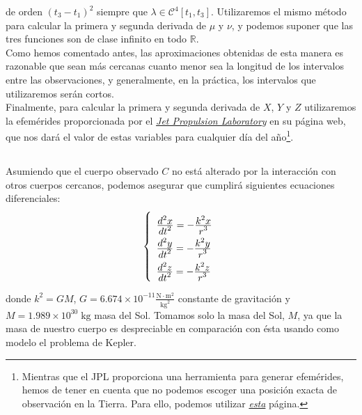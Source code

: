 \documentclass[11pt]{article}
\newcommand\ddfrac[2]{\frac{\displaystyle #1}{\displaystyle #2}}
\begin{document}
\noindent de orden $(t_3-t_1)^2$ siempre que $\lambda\in\mathcal{C}^4[t_1,t_3]$. Utilizaremos el mismo método para calcular la primera y segunda derivada de $\mu$ y $\nu$, y podemos suponer que las tres funciones son de clase infinito en todo $\mathbb{R}$.\\

Como hemos comentado antes, las aproximaciones obtenidas de esta manera es razonable que sean más cercanas cuanto menor sea la longitud de los intervalos entre las observaciones, y generalmente, en la práctica, los intervalos que utilizaremos serán cortos.\\

Finalmente, para calcular la primera y segunda derivada de $X$, $Y$ y $Z$ utilizaremos la efemérides proporcionada por el \href{https://ssd.jpl.nasa.gov/horizons.cgi}{\textit{Jet Propulsion Laboratory}} en su página web, que nos dará el valor de estas variables para cualquier día del año\footnote{Mientras que el JPL proporciona una herramienta para generar efemérides, hemos de tener en cuenta que no podemos escoger una posición exacta de observación en la Tierra. Para ello, podemos utilizar \href{http://xjubier.free.fr/en/site_pages/astronomy/ephemerides.html}{\textit{esta}} página.}.\\

\subsection{}
\label{subsec:ley_gravitacion}
Asumiendo que el cuerpo observado $C$ no está alterado por la interacción con otros cuerpos cercanos, podemos asegurar que cumplirá siguientes ecuaciones diferenciales:
\begin{align}
\left\{
\def\arraystretch{2}
\begin{array}{l}
	\ddfrac{d^2x}{dt^2}=-\ddfrac{k^2x}{r^3}\\
	\ddfrac{d^2y}{dt^2}=-\ddfrac{k^2y}{r^3}\\
	\ddfrac{d^2z}{dt^2}=-\ddfrac{k^2z}{r^3}
\end{array}
\right.
\label{eq:ley_gravitacion_C}
\end{align}

\noindent donde $k^2=GM$, $G=6.674\times10^{-11}\frac{\text{N}\cdot\text{m}^2}{\text{kg}^2}$ constante de gravitación y $M=1.989\times10^{30}\;\text{kg}$ masa del Sol. Tomamos solo la masa del Sol, $M$, ya que la masa de nuestro cuerpo es despreciable en comparación con ésta usando como modelo el problema de Kepler.\\
\end{document}
